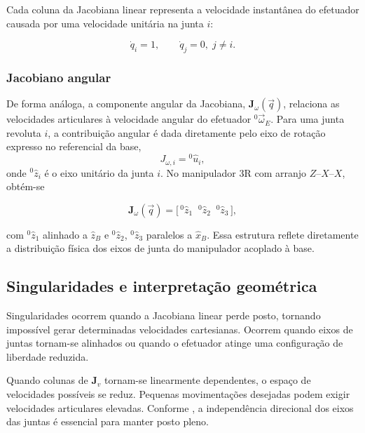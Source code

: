 Cada coluna da Jacobiana linear representa a velocidade instantânea do efetuador causada por uma velocidade unitária na junta $i$:

\begin{equation}
\dot{q}_{i} = 1,
\qquad
\dot{q}_{j} = 0,\; j \neq i.
\end{equation}

\subsubsection{Jacobiano angular}

De forma análoga, a componente angular da Jacobiana, $\mathbf{J}_{\omega}(\vec q)$, relaciona as velocidades articulares à velocidade angular do efetuador ${}^{0}\!\vec{\omega}_{E}$. Para uma junta revoluta $i$, a contribuição angular é dada diretamente pelo eixo de rotação expresso no referencial da base,
\begin{equation}
J_{\omega,i} = {}^{0}\!\hat{u}_{i},
\end{equation}
onde ${}^{0}\!\hat{z}_{i}$ é o eixo unitário da junta $i$. No manipulador 3R com arranjo $Z$--$X$--$X$, obtém-se

\begin{equation}
\mathbf{J}_{\omega}(\vec q)=
\bigl[\,{}^{0}\!\hat{z}_{1}\;\;{}^{0}\!\hat{z}_{2}\;\;{}^{0}\!\hat{z}_{3}\,\bigr], 
\end{equation}

com ${}^{0}\!\hat{z}_{1}$ alinhado a $\hat{z}_{B}$ e ${}^{0}\!\hat{z}_{2}$, ${}^{0}\!\hat{z}_{3}$ paralelos a $\hat{x}_{B}$. Essa estrutura reflete diretamente a distribuição física dos eixos de junta do manipulador acoplado à base.

\subsection{Singularidades e interpretação geométrica}
\label{sec:singularidades_jacobiana}

Singularidades ocorrem quando a Jacobiana linear perde posto, tornando impossível gerar determinadas velocidades cartesianas.
Ocorrem quando eixos de juntas tornam-se alinhados ou quando o efetuador atinge uma configuração de liberdade reduzida.

Quando colunas de $\mathbf{J}_{v}$ tornam-se linearmente dependentes, o espaço de velocidades possíveis se reduz. Pequenas movimentações desejadas podem exigir velocidades articulares elevadas. Conforme \cite{craig2005}, a independência direcional dos eixos das juntas é essencial para manter posto pleno.


